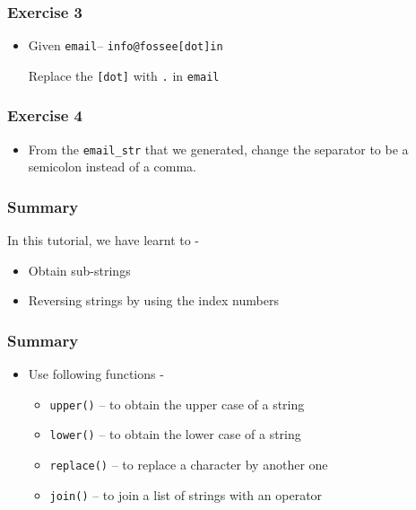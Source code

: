 \documentclass[17pt,compress]{beamer}
\begin{document}
\begin{frame}
\frametitle{Exercise 3}
\label{sec-7}


\begin{itemize}
\item Given \texttt{email}-- \texttt{info@fossee[dot]in}

  Replace the \texttt{[dot]} with \texttt{.} in \texttt{email}
\end{itemize}
\end{frame}
\begin{frame}
\frametitle{Exercise 4}
\label{sec-8}


\begin{itemize}
\item From the \texttt{email\_str} that we generated, change the separator to be a
  semicolon instead of a comma.
\end{itemize}
\end{frame}
\begin{frame}
\frametitle{Summary}
\label{sec-9.1}

  In this tutorial, we have learnt to - 

\begin{itemize}
\item Obtain sub-strings 
\item Reversing strings by using the index numbers
\end{itemize}
\end{frame}
\begin{frame}
\frametitle{Summary}
\label{sec-9.2}

\begin{itemize}
\item Use following functions -
	\begin{itemize}
	\item \texttt{upper()} -- to obtain the upper case of a string
	\item \texttt{lower()} -- to obtain the lower case of a string
	\item \texttt{replace()} -- to replace a character by another one
	\item \texttt{join()} -- to join a list of strings with an operator
	\end{itemize}
\end{itemize}
\end{frame}
\end{document}
